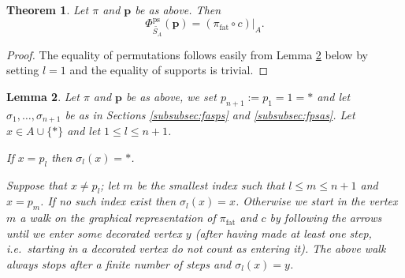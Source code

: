\documentclass[12pt,dvips]{amsart}
\numberwithin{equation}{section} \numberwithin{figure}{section}
\theoremstyle{plain}
\newtheorem{lemma}{Lemma}[section]
\newtheorem{theorem}[lemma]{Theorem}
\theoremstyle{definition}
\theoremstyle{remark}
\newcommand{\ppp}{{\mathbf{p}}}
\newcommand{\Sn}[1]{{{S}}_{#1}}
\newcommand{\xtra}{\ast}
\newcommand{\fpss}{\Phi^{\ps}_{\PartPerm{A}}}
\newcommand{\PartPerm}[1]{\widetilde{\Sn{#1}}}
\DeclareMathOperator{\fat}{fat}
\DeclareMathOperator{\ps}{ps}
\begin{document}
\begin{theorem}
\label{theo:ilewynosifpss} Let $\pi$ and $\ppp$ be as above. Then
$$ \fpss(\ppp)=(\pi_{\fat} \circ c)|_A.$$
\end{theorem}
\begin{proof}
The equality of permutations follows easily from Lemma
\ref{lem:lematoliczniufpss} below by setting $l=1$ and the equality
of supports is trivial.
\end{proof}
\begin{lemma}
\label{lem:lematoliczniufpss} Let $\pi$ and $\ppp$ be as above, we
set $p_{n+1}:=p_1=1=\xtra$ and let $\sigma_1,\dots,\sigma_{n+1}$ be
as in Sections \ref{subsubsec:fasps} and \ref{subsubsec:fpsas}. Let
$x\in A\cup\{\xtra\}$ and let $1\leq l\leq n+1$.

If $x=p_l$ then $\sigma_l(x)=\xtra$.

Suppose that $x\neq p_l$; let $m$ be the smallest index such that
$l\leq m\leq n+1$ and $x=p_m$. If no such index exist then
$\sigma_l(x)=x$. Otherwise we start in the vertex $m$ a walk on the
graphical representation of $\pi_{\fat}$ and $c$ by following the
arrows until we enter some decorated vertex $y$ (after having made
at least one step, i.e.~starting in a decorated vertex do not count
as entering it). The above walk always stops after a finite number
of steps and $\sigma_l(x)=y$.
\end{lemma}
\end{document}
